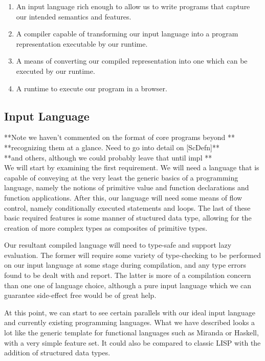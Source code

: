 \begin{enumerate}
	\item An input language rich enough to allow us to write programs
		  that capture our intended semantics and features.
	\item A compiler capable of transforming our input language into
		  a program representation executable by our runtime.
	\item A means of converting our compiled representation into one
		  which can be executed by our runtime.
	\item A runtime to execute our program in a browser. 
\end{enumerate}

\subsection{Input Language}

**Note we haven't commented on the format of core programs beyond **\\
**recognizing them at a glance. Need to go into detail on [ScDefn]**\\
**and others, although we could probably leave that until impl	  **\\

\noindent We will start by examining the first requirement. We will need a
language that is capable of conveying at the very least the generic basics 
of a programming language, namely the notions of primitive value and function
declarations and function applications. After this, our language will need
some means of flow control, namely conditionally executed statements and 
loops. The last of these basic required features is some manner of stuctured
data type, allowing for the creation of more complex types as composites of
primitive types. 

Our resultant compiled language will need to type-safe and support lazy
evaluation. The former will require some variety of type-checking to be 
performed on our input language at some stage during compilation, and any
type errors found to be dealt with and report. The latter is more of a 
compilation concern than one one of language choice, although a pure input
language which we can guarantee side-effect free would be of great help.

At this point, we can start to see certain parallels with our ideal input
language and currently existing programming languages. What we have described
looks a lot like the generic template for functional languages such as Miranda
or Haskell, with a very simple feature set. It could also be compared to 
classic LISP with the addition of structured data types. 

